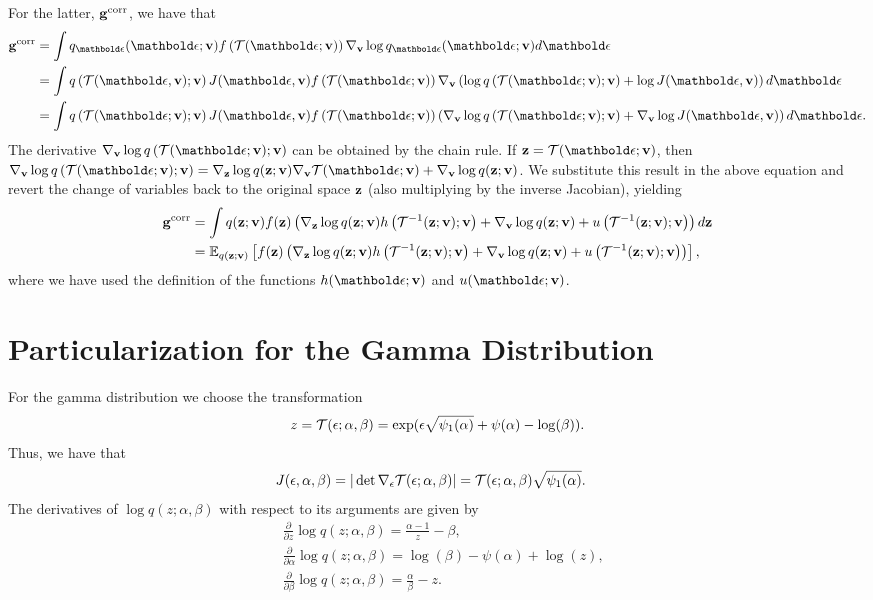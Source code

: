 \documentclass{article}
\begin{document}
For the latter, $\mathbf{g}^{\textrm{corr}}$, we have that
\begin{align}
    \bg^{\textrm{corr}} & = \int q_{\beps}(\beps;\bv)f\left(\Tcal(\beps;\bv)\right)\nabla_{\bv} \log q_{\beps}(\beps;\bv) d\beps \\ 
    & = \int q\left(\Tcal(\beps,\bv);\bv\right)J(\beps,\bv)f\left(\Tcal(\beps;\bv)\right)\nabla_{\bv} \left(\log q\left(\Tcal(\beps;\bv);\bv\right)+\log J(\beps,\bv)\right) d\beps \\ 
    & = \int q\left(\Tcal(\beps;\bv);\bv\right)J(\beps,\bv)f\left(\Tcal(\beps;\bv)\right)\left( \nabla_{\bv} \log q\left(\Tcal(\beps;\bv);\bv\right)+\nabla_{\bv} \log J(\beps,\bv)\right) d\beps. 
\end{align}
The derivative $\nabla_{\bv}\log q\left(\Tcal(\beps;\bv);\bv\right)$ can be obtained by the chain rule. If $\bz=\Tcal(\beps;\bv)$, then $\nabla_{\bv}\log q\left(\Tcal(\beps;\bv);\bv\right)=\nabla_{\bz}\log q(\bz;\bv) \nabla_{\bv}\Tcal(\beps;\bv) + \nabla_{\bv}\log q(\bz;\bv)$. We substitute this result in the above equation and revert the change of variables back to the original space $\mathbf{z}$ (also multiplying by the inverse Jacobian), yielding
\begin{equation}\label{eq:g_corr}
  \begin{split}
    \mathbf{g}^{\textrm{corr}} & = \int q(\mathbf{z};\mathbf{v}) f(\mathbf{z}) \left(\nabla_{\mathbf{z}}\log q(\mathbf{z};\mathbf{v}) h\left(\mathcal{T}^{-1}(\mathbf{z};\mathbf{v});\mathbf{v}\right) + \nabla_{\mathbf{v}}\log q(\mathbf{z};\mathbf{v})+ u\left(\mathcal{T}^{-1}(\mathbf{z};\mathbf{v});\mathbf{v} \right) \right) d\mathbf{z} \\
    & = \mathbb{E}_{q(\mathbf{z};\mathbf{v})}\left[f(\mathbf{z}) \left(\nabla_{\mathbf{z}}\log q(\mathbf{z};\mathbf{v}) h\left(\mathcal{T}^{-1}(\mathbf{z};\mathbf{v});\mathbf{v}\right) + \nabla_{\mathbf{v}}\log q(\mathbf{z};\mathbf{v})+ u\left(\mathcal{T}^{-1}(\mathbf{z};\mathbf{v});\mathbf{v} \right) \right)\right],
  \end{split}
\end{equation}
where we have used the definition of the functions $\hfun(\beps;\bv)$ and $\ufun(\beps;\bv)$.

\section{Particularization for the Gamma Distribution}

For the gamma distribution we choose the transformation
\begin{align}
z=\mathcal{T}(\epsilon;\alpha,\beta)=\exp(\epsilon\sqrt{\psi_1(\alpha)}+\psi(\alpha)-\log(\beta)).
\end{align}
Thus, we have that
\begin{align}
    & J(\epsilon,\alpha,\beta) = |\det \nabla_{\epsilon}\mathcal{T}(\epsilon;\alpha,\beta)| = \mathcal{T}(\epsilon;\alpha,\beta)\sqrt{\psi_1(\alpha)}.
\end{align}
The derivatives of $\log q(z;\alpha,\beta)$ with respect to its arguments are given by
\begin{align}
    & \frac{\partial}{\partial z}\log q(z;\alpha,\beta) = \frac{\alpha-1}{z}-\beta,\\
    & \frac{\partial}{\partial \alpha}\log q(z;\alpha,\beta) = \log(\beta)-\psi(\alpha)+\log(z),\\
    & \frac{\partial}{\partial \beta}\log q(z;\alpha,\beta) = \frac{\alpha}{\beta}-z.
\end{align}
\end{document}
